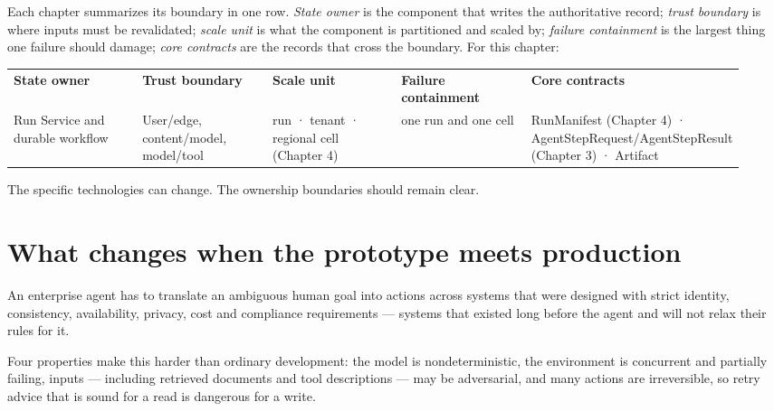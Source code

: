 Each chapter summarizes its boundary in one row. \emph{State owner} is the component that writes the authoritative record; \emph{trust boundary} is where inputs must be revalidated; \emph{scale unit} is what the component is partitioned and scaled by; \emph{failure containment} is the largest thing one failure should damage; \emph{core contracts} are the records that cross the boundary. For this chapter:\par

\BookTableStart
\fontsize{7.2}{9}\selectfont
\begin{tabular}{@{}Y{0.1880\linewidth}Y{0.1880\linewidth}Y{0.1880\linewidth}Y{0.1880\linewidth}Y{0.1880\linewidth}@{}}
\color{white}\bfseries \textbf{State owner} & \color{white}\bfseries \textbf{Trust boundary} & \color{white}\bfseries \textbf{Scale unit} & \color{white}\bfseries \textbf{Failure containment} & \color{white}\bfseries \textbf{Core contracts} \\
Run Service and durable workflow & User/edge, content/model, model/tool & run · tenant · regional cell (Chapter 4) & one run and one cell & RunManifest (Chapter 4) · AgentStepRequest/AgentStepResult (Chapter 3) · Artifact \\
\end{tabular}
\BookTableEnd

The specific technologies can change. The ownership boundaries should remain clear.\par

\section{What changes when the prototype meets production}

An enterprise agent has to translate an ambiguous human goal into actions across systems that were designed with strict identity, consistency, availability, privacy, cost and compliance requirements — systems that existed long before the agent and will not relax their rules for it.\par

Four properties make this harder than ordinary development: the model is nondeterministic, the environment is concurrent and partially failing, inputs — including retrieved documents and tool descriptions — may be adversarial, and many actions are irreversible, so retry advice that is sound for a read is dangerous for a write.\par

